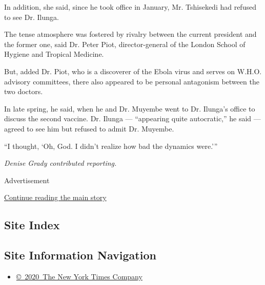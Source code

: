 In addition, she said, since he took office in January, Mr. Tshisekedi
had refused to see Dr. Ilunga.

The tense atmosphere was fostered by rivalry between the current
president and the former one, said Dr. Peter Piot, director-general of
the London School of Hygiene and Tropical Medicine.

But, added Dr. Piot, who is a discoverer of the Ebola virus and serves
on W.H.O. advisory committees, there also appeared to be personal
antagonism between the two doctors.

In late spring, he said, when he and Dr. Muyembe went to Dr. Ilunga's
office to discuss the second vaccine. Dr. Ilunga --- ``appearing quite
autocratic,'' he said --- agreed to see him but refused to admit Dr.
Muyembe.

``I thought, `Oh, God. I didn't realize how bad the dynamics were.'''

\emph{Denise Grady contributed reporting.}

Advertisement

\protect\hyperlink{after-bottom}{Continue reading the main story}

\hypertarget{site-index}{%
\subsection{Site Index}\label{site-index}}

\hypertarget{site-information-navigation}{%
\subsection{Site Information
Navigation}\label{site-information-navigation}}

\begin{itemize}
\tightlist
\item
  \href{https://help.nytimes3xbfgragh.onion/hc/en-us/articles/115014792127-Copyright-notice}{©~2020~The
  New York Times Company}
\end{itemize}

